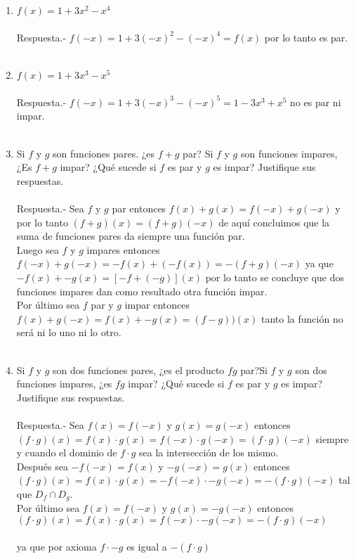 \begin{enumerate}
    \item $f(x)=1+3x^2 - x^4$\\\\
	Respuesta.-\; $f(-x)=1+3(-x)^2 - (-x)^4 = f(x)$ por lo tanto es par.\\\\

    \item $f(x)=1+3x^3-x^5$\\\\
	Respuesta.-\; $f(-x)=1+ 3(-x)^3 - (-x)^5 = 1 - 3x^3 + x^5 $ no es par ni impar.\\\\

    \item Si $f$  y $g$ son funciones pares. ¿es $f+g$ par? Si $f$ y $g$ son funciones impares, ¿Es $f+g$ impar? ¿Qué sucede si $f$ es par y $g$ es impar? Justifique sus respuestas.\\\\
	Respuesta.-\; Sea $f$ y $g$ par entonces $f(x) + g(x) = f(-x) + g(-x)$ y por lo tanto $(f+g)(x)=(f+g)(-x)$ de aquí concluimos que la suma de funciones pares da siempre una función par.\\
	Luego sea $f$ y $g$ impares entonces $f(-x) + g(-x) = -f(x) + (-f(x)) = -(f+g)(-x)$ ya que $-f(x) + -g(x) =\left[-f + (-g)\right](x)$  por lo tanto se concluye que dos funciones impares dan como resultado otra función impar.\\
	Por último sea $f$ par y $g$ impar entonces $f(x) + g(-x) = f(x) + -g(x) = (f-g))(x)$  tanto  la función no será ni lo uno ni lo otro.\\\\

    \item Si $f$ y $g$ son dos funciones pares, ¿es el producto $fg$ par?Si $f$ y $g$ son dos funciones impares, ¿es $fg$ impar? ¿Qué sucede si $f$ es par y $g$ es impar? Justifique sus respuestas.\\\\
	Respuesta.-\; Sea $f(x)=f(-x)$ y $g(x)=g(-x)$ entonces $(f\cdot g)(x) = f(x)\cdot g(x) =f(-x)\cdot g(-x) = (f\cdot g)(-x)$ siempre y cuando el dominio de $f\cdot g$ sea la intersección de los mismo.\\
	Después sea $-f(-x)=f(x)$ y $-g(-x)=g(x)$ entonces $(f\cdot g)(x) = f(x)\cdot g(x) = -f(-x)\cdot -g(-x) = -(f\cdot g)(-x)$ tal que $D_f\cap D_g$.\\
	Por último sea $f(x)=f(-x)$ y $g(x)=-g(-x)$ entonces $(f\cdot g)(x)=f(x)\cdot g(x)=f(-x)\cdot -g(-x) = -(f\cdot g)(-x)$\\\\ ya que por axioma $f\cdot -g$ es igual a $-(f\cdot g)$\\\\ 

\end{enumerate}


